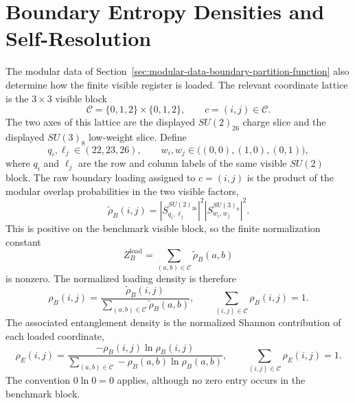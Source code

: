 \documentclass[11pt,letterpaper]{article}
\theoremstyle{plain}
\begin{document}
\section{Boundary Entropy Densities and Self-Resolution}
\label{sec:boundary-entropy-densities-self-resolution}

The modular data of Section~\ref{sec:modular-data-boundary-partition-function}
also determine how the finite visible register is loaded.  The relevant
coordinate lattice is the $3\times3$ visible block
\begin{equation}
\label{eq:section-four-coordinate-lattice}
 \mathcal C=\{0,1,2\}\times\{0,1,2\},
 \qquad
 c=(i,j)\in\mathcal C.
\end{equation}
The two axes of this lattice are the displayed $SU(2)_{26}$ charge slice and
the displayed $SU(3)_8$ low-weight slice.  Define
\begin{equation}
\label{eq:section-four-visible-labels}
 q_i,\ell_j\in(22,23,26),
 \qquad
 w_i,w_j\in\bigl((0,0),(1,0),(0,1)\bigr),
\end{equation}
where $q_i$ and $\ell_j$ are the row and column labels of the same visible
$SU(2)$ block.  The raw boundary loading assigned to $c=(i,j)$ is the product
of the modular overlap probabilities in the two visible factors,
\begin{equation}
\label{eq:section-four-raw-loading-density}
 \widetilde\rho_B(i,j)
 =
 \left|S^{SU(2)_{26}}_{q_i,\ell_j}\right|^2
 \left|S^{SU(3)_8}_{w_i,w_j}\right|^2.
\end{equation}
This is positive on the benchmark visible block, so the finite normalization
constant
\begin{equation}
\label{eq:section-four-loading-partition}
 Z_B^{\text{load}}
 =
 \sum_{(a,b)\in\mathcal C}\widetilde\rho_B(a,b)
\end{equation}
is nonzero.  The normalized loading density is therefore
\begin{equation}
\label{eq:section-four-normalized-loading-density}
 \rho_B(i,j)
 =
 \frac{\widetilde\rho_B(i,j)}
 {\sum_{(a,b)\in\mathcal C}\widetilde\rho_B(a,b)},
 \qquad
 \sum_{(i,j)\in\mathcal C}\rho_B(i,j)=1.
\end{equation}
The associated entanglement density is the normalized Shannon contribution of
each loaded coordinate,
\begin{equation}
\label{eq:section-four-normalized-entanglement-density}
 \rho_E(i,j)
 =
 \frac{-\rho_B(i,j)\ln\rho_B(i,j)}
 {\sum_{(a,b)\in\mathcal C}-\rho_B(a,b)\ln\rho_B(a,b)},
 \qquad
 \sum_{(i,j)\in\mathcal C}\rho_E(i,j)=1.
\end{equation}
The convention $0\ln0=0$ applies, although no zero entry occurs in the
benchmark block.
\end{document}
